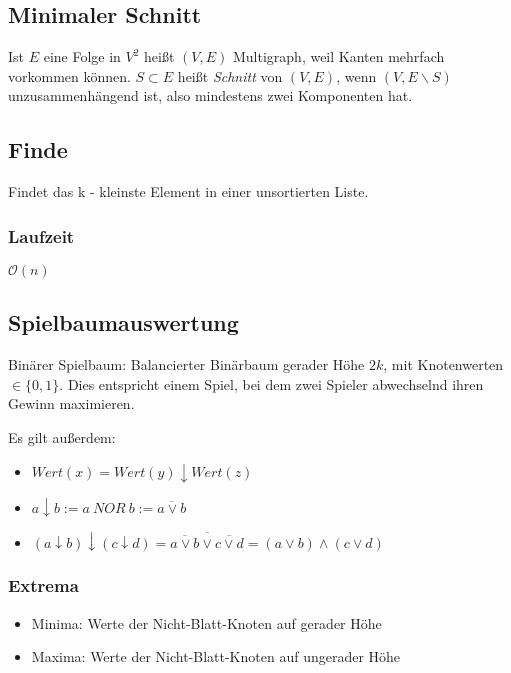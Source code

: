 \subsection{Minimaler Schnitt}
Ist \(E\) eine Folge in \(V^2\) heißt \((V,E)\) Multigraph, weil Kanten mehrfach vorkommen können. \(S \subset E\) heißt \textit{Schnitt} von \((V,E)\), wenn \((V, E \backslash S)\) unzusammenhängend ist, also mindestens zwei Komponenten hat.



\subsection{Finde}
Findet das k - kleinste Element in einer unsortierten Liste.\\


\subsubsection{Laufzeit}
\(\mathcal{O}(n)\)

\subsection{Spielbaumauswertung}
Binärer Spielbaum: Balancierter Binärbaum gerader Höhe \(2k\), mit Knotenwerten \(\in \{0,1\}\). Dies entspricht einem Spiel, bei dem zwei Spieler abwechselnd ihren Gewinn maximieren.

Es gilt außerdem:
\begin{itemize}
	\item \(Wert(x) = Wert(y) \downarrow Wert(z)\)
	\item \(a \downarrow b := a~NOR~b := \overline{a \vee b}\)
	\item \((a \downarrow b) \downarrow (c \downarrow d) = \overline{\overline{a \vee b} \vee \overline{c \vee d}} = (a \vee b) \wedge (c \vee d)\)
\end{itemize}

\subsubsection{Extrema}
\begin{itemize}
	\item Minima: Werte der Nicht-Blatt-Knoten auf gerader Höhe
	\item Maxima: Werte der Nicht-Blatt-Knoten auf ungerader Höhe
\end{itemize}




